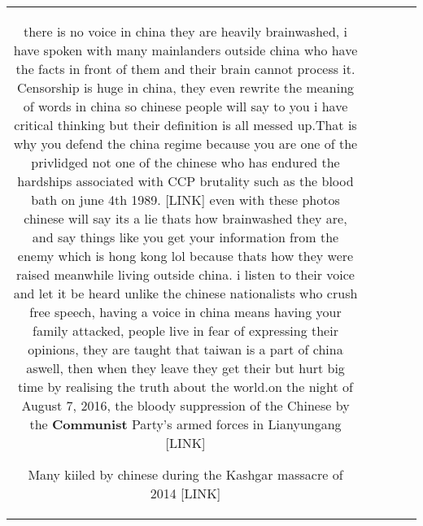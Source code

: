 \documentclass[11pt]{article}
\newlength\mylength
\begin{document}
\begin{center}
\begin{longtable}{|C{.65\mylength}|C{.30\mylength}|C{.12\mylength}|C{.12\mylength}|C{.12\mylength}|}
there is no voice in china they are heavily brainwashed, i have spoken with many mainlanders outside china who have the facts in front of them and their brain cannot process it. Censorship is huge in china, they even rewrite the meaning of words in china so chinese people will say to you i have critical thinking but their definition is all messed up.That is why you defend the china regime because you are one of the privlidged not one of the chinese who has endured the hardships associated with CCP brutality such as the blood bath on june 4th 1989.  [LINK]   even with these photos chinese will say its a lie thats how brainwashed they are, and say things like you get your information from the enemy which is hong kong lol because thats how they were raised meanwhile living outside china. i listen to their voice and let it be heard unlike the chinese nationalists who crush free speech, having a voice in china means having your family attacked, people live in fear of expressing their opinions, they are taught that taiwan is a part of china aswell, then when they leave they get their but hurt big time by realising the truth about the world.on the night of August 7, 2016, the bloody suppression of the Chinese by the \textbf{Communist} Party's armed forces in Lianyungang  [LINK]  

Many kiiled by chinese during the Kashgar massacre of 2014  [LINK] 


\end{longtable}
\end{center}
\end{document}
